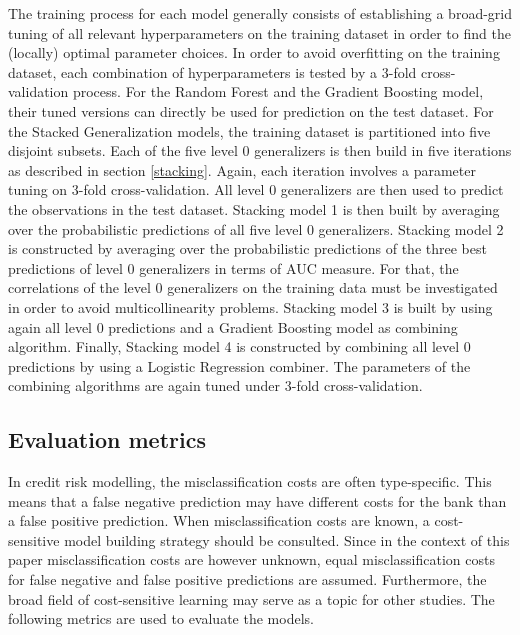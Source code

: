 \documentclass[12pt]{article}
\begin{document}
The training process for each model generally consists of establishing a broad-grid tuning of all relevant hyperparameters on the training dataset in order to find the (locally) optimal parameter choices. In order to avoid overfitting on the training dataset, each combination of hyperparameters is tested by a 3-fold cross-validation process. For the Random Forest and the Gradient Boosting model, their tuned versions can directly be used for prediction on the test dataset. For the Stacked Generalization models, the training dataset is partitioned into five disjoint subsets. Each of the five level 0 generalizers is then build in five iterations as described in section \ref{stacking}. Again, each iteration involves a parameter tuning on 3-fold cross-validation. All level 0 generalizers are then used to predict the observations in the test dataset. Stacking model 1 is then built by averaging over the probabilistic predictions of all five level 0 generalizers. Stacking model 2 is constructed by averaging over the probabilistic predictions of the three best predictions of level 0 generalizers in terms of AUC measure. For that, the correlations of the level 0 generalizers on the training data must be investigated in order to avoid multicollinearity problems. Stacking model 3 is built by using again all level 0 predictions and a Gradient Boosting model as combining algorithm. Finally, Stacking model 4 is constructed by combining all level 0 predictions by using a Logistic Regression combiner. The parameters of the combining algorithms are again tuned under 3-fold cross-validation.

\subsection{Evaluation metrics}\label{metrics}
In credit risk modelling, the misclassification costs are often type-specific. This means that a false negative prediction may have different costs for the bank than a false positive prediction. When misclassification costs are known, a cost-sensitive model building strategy should be consulted. Since in the context of this paper misclassification costs are however unknown, equal misclassification costs for false negative and false positive predictions are assumed. Furthermore, the broad field of cost-sensitive learning may serve as a topic for other studies. The following metrics are used to evaluate the models.
\end{document}
